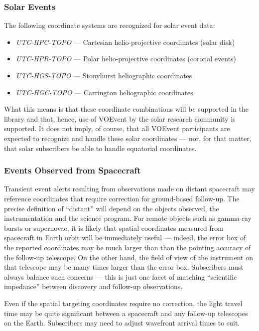 \documentclass[11pt,a4paper]{ivoa}
\begin{document}
\subsubsection{Solar Events}
\label{sec:3.4.4}
The following coordinate systems are recognized for solar event data: 
\begin{itemize}
\item \emph{UTC-HPC-TOPO} --- Cartesian helio-projective coordinates (solar disk)
\item \emph{UTC-HPR-TOPO} --- Polar helio-projective coordinates (coronal events)
\item \emph{UTC-HGS-TOPO} --- Stonyhurst heliographic coordinates
\item \emph{UTC-HGC-TOPO} --- Carrington heliographic coordinates
\end{itemize}

What this means is that these coordinate combinations will be supported in the library and that, hence, use of VOEvent by the solar research community is supported. It does not imply, of course, that all VOEvent participants are expected to recognize and handle these solar coordinates --- nor, for that matter, that solar subscribers be able to handle equatorial coordinates. 

\subsubsection{Events Observed from Spacecraft}
\label{sec:3.4.5}
Transient event alerts resulting from observations made on distant spacecraft may reference coordinates that require correction for ground-based follow-up. The precise definition of ``distant'' will depend on the objects observed, the instrumentation and the science program. For remote objects such as gamma-ray bursts or supernovae, it is likely that spatial coordinates measured from spacecraft in Earth orbit will be immediately useful --- indeed, the error box of the reported coordinates may be much larger than than the pointing accuracy of the follow-up telescope. On the other hand, the field of view of the instrument on that telescope may be many times larger than the error box. Subscribers must always balance such concerns --- this is just one facet of matching ``scientific impedance'' between discovery and follow-up observations. 

Even if the spatial targeting coordinates require no correction, the light travel time may be quite significant between a spacecraft and any follow-up telescopes on the Earth. Subscribers may need to adjust wavefront arrival times to suit. 
\end{document}
